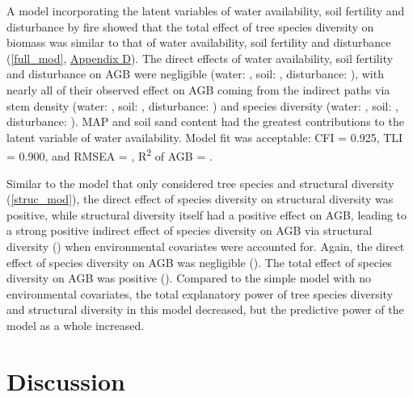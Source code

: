 \documentclass[11pt,a4paper]{article}
\begin{document}
A model incorporating the latent variables of water availability, soil fertility and disturbance by fire showed that the total effect of tree species diversity on biomass was similar to that of water availability, soil fertility and disturbance (\autoref{full_mod}, \hyperref[appendixd]{Appendix D}). The direct effects of water availability, soil fertility and disturbance on AGB were negligible (water: \fmbetamb{}, soil: \fmbetasb{}, disturbance: \fmbetafb{}), with nearly all of their observed effect on AGB coming from the indirect paths via stem density (water: \fmbetamib{}, soil: \fmbetasib{}, disturbance: \fmbetafib{}) and species diversity (water: \fmbetamd{}, soil: \fmbetasd{}, disturbance: \fmbetafd{}). MAP and soil sand content had the greatest contributions to the latent variable of water availability. Model fit was acceptable: CFI = 0.925, TLI = 0.900, and RMSEA = \fmrmsea{}, R\textsuperscript{2} of AGB = \fmrsq{}. 

Similar to the model that only considered tree species and structural diversity (\autoref{struc_mod}), the direct effect of species diversity on structural diversity was positive, while structural diversity itself had a positive effect on AGB, leading to a strong positive indirect effect of species diversity on AGB via structural diversity (\fmbetadhb{}) when environmental covariates were accounted for. Again, the direct effect of species diversity on AGB was negligible (\fmbetadb{}). The total effect of species diversity on AGB was positive (\fmbetatotaldb{}). Compared to the simple model with no environmental covariates, the total explanatory power of tree species diversity and structural diversity in this model decreased, but the predictive power of the model as a whole increased.


\section{Discussion}
\end{document}
